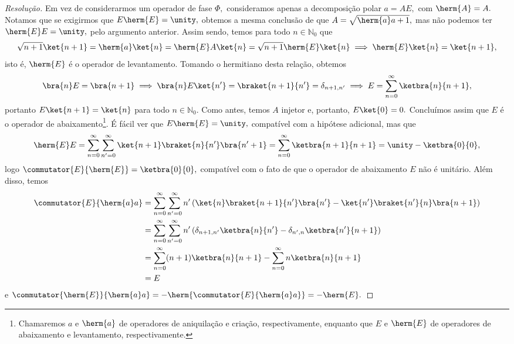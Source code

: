 \begin{proof}[Resolução]
   Em vez de considerarmos um operador de fase \(\Phi,\) consideramos apenas a decomposição polar \(a = A E,\) com \(\herm{A} = A.\) Notamos que se exigirmos que \(E \herm{E} = \unity,\) obtemos a mesma conclusão de que \(A = \sqrt{\herm{a}a + 1},\) mas não podemos ter \(\herm{E} E = \unity,\) pelo argumento anterior. Assim sendo, temos para todo \(n \in \mathbb{N}_0\) que
   \begin{equation*}
      \sqrt{n+1} \ket{n+1} = \herm{a} \ket{n} = \herm{E} A \ket{n} = \sqrt{n+1} \herm{E} \ket{n} \implies \herm{E}\ket{n} = \ket{n+1},
   \end{equation*}
   isto é, \(\herm{E}\) é o operador de levantamento. Tomando o hermitiano desta relação, obtemos
   \begin{equation*}
      \bra{n} E = \bra{n+1} \implies \bra{n} E \ket{n'} = \braket{n+1}{n'} = \delta_{n+1, n'} \implies E = \sum_{n = 0}^\infty \ketbra{n}{n+1},
   \end{equation*}
   portanto \(E\ket{n+1} = \ket{n}\) para todo \(n \in \mathbb{N}_0\). Como antes, temos \(A\) injetor e, portanto, \(E\ket{0} = 0.\) Concluímos assim que \(E\) é o operador de abaixamento\footnote{Chamaremos \(a\) e \(\herm{a}\) de operadores de aniquilação e criação, respectivamente, enquanto que \(E\) e \(\herm{E}\) de operadores de abaixamento e levantamento, respectivamente.}. É fácil ver que \(E \herm{E} = \unity,\) compatível com a hipótese adicional, mas que
   \begin{equation*}
      \herm{E}E = \sum_{n = 0}^\infty \sum_{n' = 0}^\infty \ket{n+1} \braket{n}{n'} \bra{n'+1} = \sum_{n = 0}^\infty \ketbra{n+1}{n+1} = \unity - \ketbra{0}{0},
   \end{equation*}
   logo \(\commutator{E}{\herm{E}} = \ketbra{0}{0},\) compatível com o fato de que o operador de abaixamento \(E\) não é unitário. Além disso, temos
   \begin{align*}
      \commutator{E}{\herm{a}a} &= \sum_{n = 0}^\infty \sum_{n' = 0}^\infty n'\left(\ket{n}\braket{n+1}{n'}\bra{n'} - \ket{n'}\braket{n'}{n}\bra{n+1}\right)\\
                                &= \sum_{n=0}^\infty \sum_{n' = 0}^\infty n' \left(\delta_{n+1, n'} \ketbra{n}{n'} - \delta_{n',n} \ketbra{n'}{n+1}\right)\\
                                &= \sum_{n=0}^\infty (n+1) \ketbra{n}{n+1} - \sum_{n=0}^\infty n \ketbra{n}{n+1}\\
                                &= E
   \end{align*}
   e \(\commutator{\herm{E}}{\herm{a}a} = - \herm{\commutator{E}{\herm{a}a}} = - \herm{E}.\)


\end{proof}
